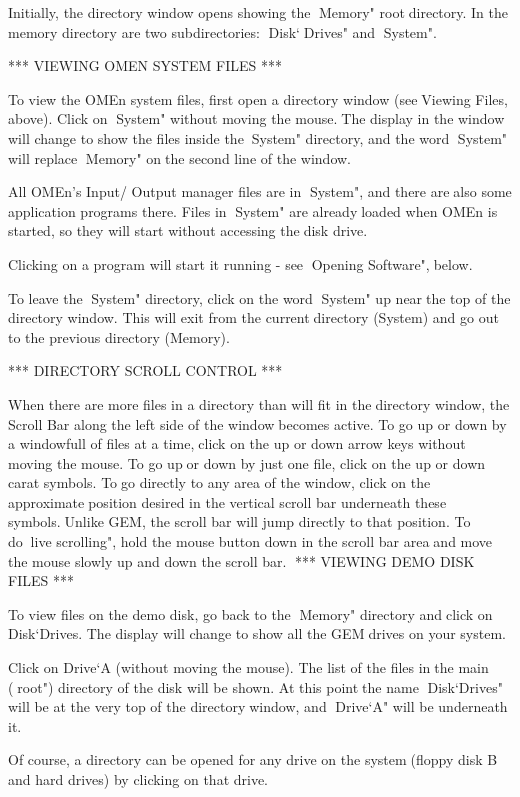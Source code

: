 Initially, the directory window opens showing the Memory" rootdirectory. In the memory directory are two subdirectories: Disk`Drives" and System".


*** VIEWING OMEN SYSTEM FILES ***

To view the OMEn system files, first open a directory window (seeViewing Files, above). Click on System" without moving the mouse.The display in the window will change to show the files inside theSystem" directory, and the word System" will replace Memory" onthe second line of the window.

All OMEn's Input/ Output manager files are in System", and there arealso some application programs there. Files in System" are alreadyloaded when OMEn is started, so they will start without accessing thedisk drive.

Clicking on a program will start it running - see Opening Software",below.

To leave the System" directory, click on the word System" up nearthe top of the directory window. This will exit from the currentdirectory (System) and go out to the previous directory (Memory).


*** DIRECTORY SCROLL CONTROL ***

When there are more files in a directory than will fit in thedirectory window, the Scroll Bar along the left side of the windowbecomes active. To go up or down by a windowfull of files at a time,click on the up or down arrow keys without moving the mouse. To go upor down by just one file, click on the up or down carat symbols. Togo directly to any area of the window, click on the approximateposition desired in the vertical scroll bar underneath these symbols.Unlike GEM, the scroll bar will jump directly to that position. To dolive scrolling", hold the mouse button down in the scroll bar areaand move the mouse slowly up and down the scroll bar.
*** VIEWING DEMO DISK FILES ***

To view files on the demo disk, go back to the Memory" directory andclick on Disk`Drives. The display will change to show all the GEMdrives on your system.

Click on Drive`A (without moving the mouse). The list of the files inthe main (root") directory of the disk will be shown. At this pointthe name Disk`Drives" will be at the very top of the directorywindow, and Drive`A" will be underneath it.

Of course, a directory can be opened for any drive on the system(floppy disk B and hard drives) by clicking on that drive.

